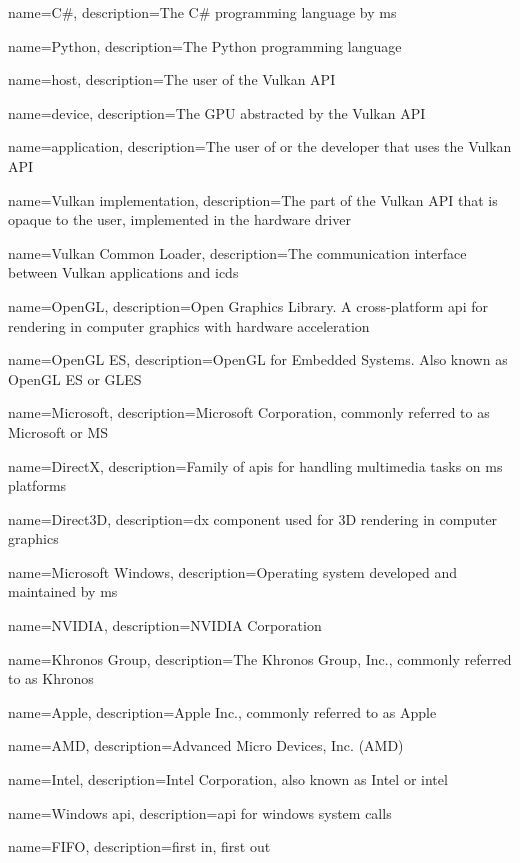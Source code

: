 {
  name={C\#},
  description={The C\# programming language by \gls{ms}}
}

{
  name={Python},
  description={The Python programming language}
}

{
  name={host},
  description={The user of the Vulkan API}
}

{
  name={device},
  description={The GPU abstracted by the Vulkan API}
}

{
  name={application},
  description={The user of or the developer that uses the Vulkan API}
}

{
  name={Vulkan implementation},
  description={The part of the Vulkan API that is opaque to the user, implemented in the hardware driver}
}

{
  name={Vulkan Common Loader},
  description={The communication interface between Vulkan applications and \glspl{icd}}
}

{
  name={OpenGL},
  description={Open Graphics Library. A cross-platform \gls{api} for rendering in computer graphics with hardware acceleration}
}

{
  name={OpenGL ES},
  description={OpenGL for Embedded Systems. Also known as OpenGL ES or GLES}
}

{
  name={Microsoft},
  description={Microsoft Corporation, commonly referred to as Microsoft or MS}
}

{
  name={DirectX},
  description={Family of \glspl{api} for handling multimedia tasks on \gls{ms} platforms}
}

{
  name={Direct3D},
  description={\gls{dx} component used for 3D rendering in computer graphics}
}

{
  name={Microsoft Windows},
  description={Operating system developed and maintained by \gls{ms}}
}

{
  name={NVIDIA},
  description={NVIDIA Corporation}
}

{
  name={Khronos Group},
  description={The Khronos Group, Inc., commonly referred to as Khronos}
}

{
  name={Apple},
  description={Apple Inc., commonly referred to as Apple}
}

{
  name={AMD},
  description={Advanced Micro Devices, Inc. (AMD)}
}

{
  name={Intel},
  description={Intel Corporation, also known as Intel or intel}
}

{
  name={Windows \gls{api}},
  description={\gls{api} for \gls{windows} system calls}
}

{
  name={FIFO},
  description={first in, first out}
}
